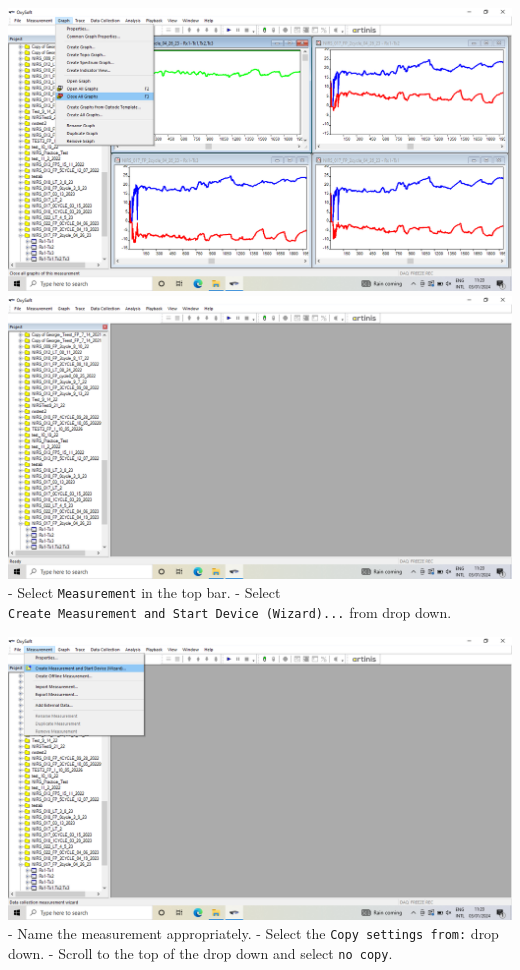 \documentclass[
]{book}
\begin{document}
\includegraphics[width=1\linewidth]{images/startnewmeasurement/02_select_close_all_graphs}
\includegraphics[width=1\linewidth]{images/startnewmeasurement/03_closed_all_graphs}
- Select \texttt{Measurement} in the top bar.
- Select \texttt{Create\ Measurement\ and\ Start\ Device\ (Wizard)...} from drop down.

\includegraphics[width=1\linewidth]{images/startnewmeasurement/04_select_start_new}
- Name the measurement appropriately.
- Select the \texttt{Copy\ settings\ from:} drop down.
- Scroll to the top of the drop down and select \texttt{no\ copy}.
\end{document}
